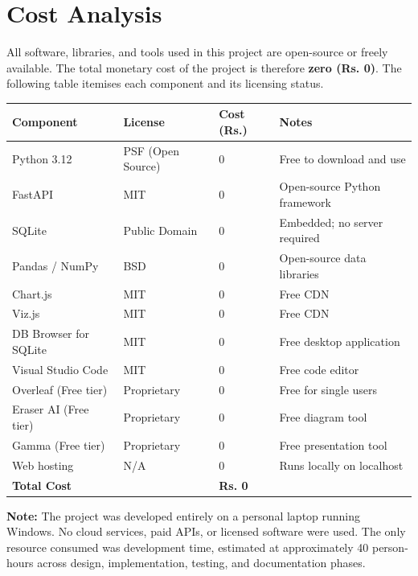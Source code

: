 \documentclass[12pt, a4paper]{report}
\begin{document}
\chapter{Cost Analysis}

All software, libraries, and tools used in this project are open-source or freely available. The total monetary cost of the project is therefore \textbf{zero (Rs. 0)}. The following table itemises each component and its licensing status.

\begin{longtable}{@{} p{4.5cm} p{3cm} p{3cm} p{3cm} @{}}
    \toprule
    \textbf{Component} & \textbf{License} & \textbf{Cost (Rs.)} & \textbf{Notes} \\
    \midrule
    \endhead
    Python 3.12         & PSF (Open Source) & 0   & Free to download and use \\
    FastAPI             & MIT               & 0   & Open-source Python framework \\
    SQLite              & Public Domain     & 0   & Embedded; no server required \\
    Pandas / NumPy      & BSD               & 0   & Open-source data libraries \\
    Chart.js            & MIT               & 0   & Free CDN \\
    Viz.js              & MIT               & 0   & Free CDN \\
    DB Browser for SQLite & MIT            & 0   & Free desktop application \\
    Visual Studio Code  & MIT               & 0   & Free code editor \\
    Overleaf (Free tier)& Proprietary       & 0   & Free for single users \\
    Eraser AI (Free tier)& Proprietary     & 0   & Free diagram tool \\
    Gamma (Free tier)   & Proprietary       & 0   & Free presentation tool \\
    Web hosting         & N/A               & 0   & Runs locally on localhost \\
    \midrule
    \textbf{Total Cost} & & \textbf{Rs. 0} & \\
    \bottomrule
\end{longtable}

\textbf{Note:} The project was developed entirely on a personal laptop running Windows. No cloud services, paid APIs, or licensed software were used. The only resource consumed was development time, estimated at approximately 40 person-hours across design, implementation, testing, and documentation phases.
\end{document}
